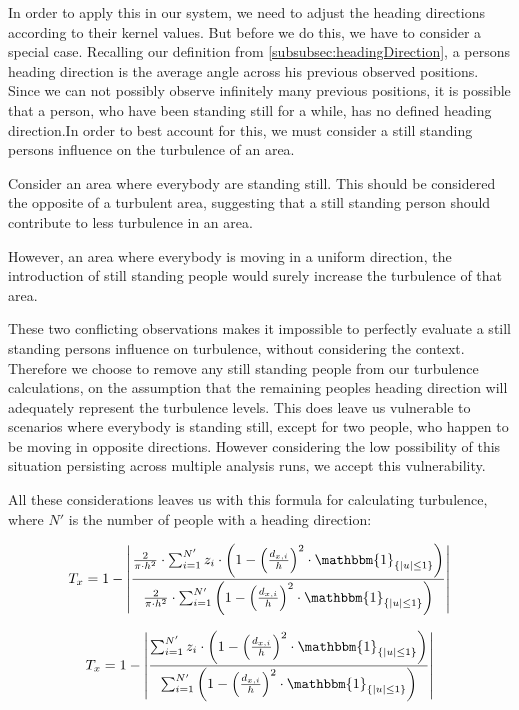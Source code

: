In order to apply this in our system, we need to adjust the heading directions according to their kernel values. But before we do this, we have to consider a special case. Recalling our definition from \cref{subsubsec:headingDirection}, a persons heading direction is the average angle across his previous observed positions. Since we can not possibly observe infinitely many previous positions, it is possible that a person, who have been standing still for a while, has no defined heading direction.In order to best account for this, we must consider a still standing persons influence on the turbulence of an area.

Consider an area where everybody are standing still. This should be considered the opposite of a turbulent area, suggesting that a still standing person should contribute to less turbulence in an area.

However, an area where everybody is moving in a uniform direction, the introduction of still standing people would surely increase the turbulence of that area.

These two conflicting observations makes it impossible to perfectly evaluate a still standing persons influence on turbulence, without considering the context. Therefore we choose to remove any still standing people from our turbulence calculations, on the assumption that the remaining peoples heading direction will adequately represent the turbulence levels. This does leave us vulnerable to scenarios where everybody is standing still, except for two people, who happen to be moving in opposite  directions. However considering the low possibility of this situation persisting across multiple analysis runs, we accept this vulnerability.

All these considerations leaves us with this formula for calculating turbulence, where $N'$ is the number of people with a heading direction:

\begin{equation}
\label{eq:}
T_x = 1 - \left|\frac{\frac{2}{\pi \cdot h^2} \cdot \sum_{i=1}^{N'} z_i \cdot \left(1-\left(\frac{d_{x,i}}{h}\right)^2 \cdot \mathbbm{1}_{\{|u| \leq 1\} }\right)}{\frac{2}{\pi \cdot h^2} \cdot \sum_{i=1}^{N'} \left(1-\left(\frac{d_{x,i}}{h}\right)^2 \cdot \mathbbm{1}_{\{|u| \leq 1\} }\right)}\right|
\end{equation}

\begin{equation}
\label{eq:}
T_x = 1 - \left|\frac{\sum_{i=1}^{N'} z_i \cdot \left(1-\left(\frac{d_{x,i}}{h}\right)^2 \cdot \mathbbm{1}_{\{|u| \leq 1\} }\right)}{\sum_{i=1}^{N'} \left(1-\left(\frac{d_{x,i}}{h}\right)^2 \cdot \mathbbm{1}_{\{|u| \leq 1\} }\right)}\right|
\end{equation}

